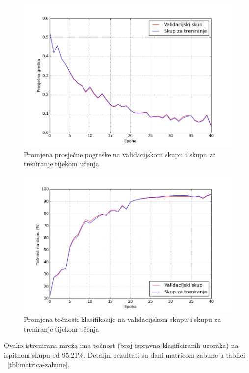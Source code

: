 \documentclass[times, utf8, zavrsni, numeric]{fer}
\begin{document}
\begin{figure}
    \centering
    \includegraphics[width=14cm]{img/graf-greska.png}
    \caption{Promjena prosječne pogreške na validacijskom skupu i skupu za treniranje tijekom učenja}
    \label{fig:graf-greska}
\end{figure}

\begin{figure}
    \centering
    \includegraphics[width=14cm]{img/graf-tocnost.png}
    \caption{Promjena točnosti klasifikacije na validacijskom skupu i skupu za treniranje tijekom učenja}
    \label{fig:graf-tocnost}
\end{figure}

Ovako istrenirana mreža ima točnost (broj ispravno klasificiranih uzoraka) na ispitnom skupu od 95.21\%. Detaljni rezultati su dani matricom zabune u tablici ~\ref{tbl:matrica-zabune}.
 
\end{document}
